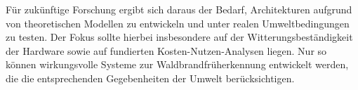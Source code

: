 Für zukünftige Forschung ergibt sich daraus der Bedarf, Architekturen aufgrund von theoretischen Modellen zu entwickeln und unter realen Umweltbedingungen zu testen. Der Fokus sollte hierbei insbesondere auf der Witterungsbeständigkeit der Hardware sowie auf fundierten Kosten-Nutzen-Analysen liegen. Nur so können wirkungsvolle Systeme zur Waldbrandfrüherkennung entwickelt werden, die die entsprechenden Gegebenheiten der Umwelt berücksichtigen.


